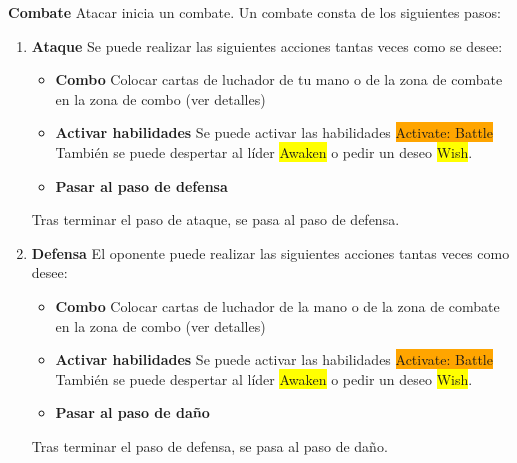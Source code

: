 \documentclass[10pt,a4paper]{article}
\begin{document}
\begin{shaded}
  \textbf{Combate} \newline
  Atacar inicia un combate. Un combate consta de los siguientes pasos:

  \begin{enumerate}
    \item \textbf{Ataque} \newline
    Se puede realizar las siguientes acciones tantas veces como se desee:
    \begin{itemize}
      \item \textbf{Combo} \newline
      Colocar cartas de luchador de tu mano o de la zona de combate en la zona de combo (ver detalles)
      \item \textbf{Activar habilidades} \newline
      Se puede activar las habilidades \colorbox{orange}{\color{white}Activate: Battle} \newline
      También se puede despertar al líder \colorbox{yellow}{Awaken} o pedir un deseo \colorbox{yellow}{Wish}.
      \item \textbf{Pasar al paso de defensa}
    \end{itemize}
    Tras terminar el paso de ataque, se pasa al paso de defensa.

    \item \textbf{Defensa} \newline
    El oponente puede realizar las siguientes acciones tantas veces como desee:
    \begin{itemize}
      \item \textbf{Combo} \newline
      Colocar cartas de luchador de la mano o de la zona de combate en la zona de combo (ver detalles)
      \item \textbf{Activar habilidades} \newline
      Se puede activar las habilidades \colorbox{orange}{\color{white}Activate: Battle} \newline
      También se puede despertar al líder \colorbox{yellow}{Awaken} o pedir un deseo \colorbox{yellow}{Wish}.
      \item \textbf{Pasar al paso de daño}
    \end{itemize}
    Tras terminar el paso de defensa, se pasa al paso de daño.


\end{enumerate}
\end{shaded}
\end{document}
